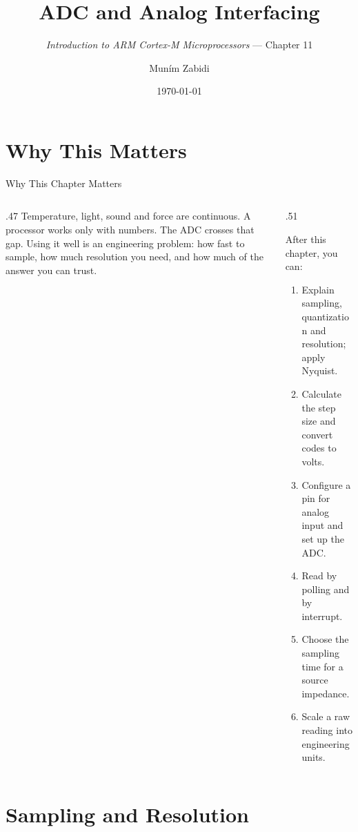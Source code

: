 \documentclass[9pt,aspectratio=169,xcolor=table]{beamer}
\title{ADC and Analog Interfacing}
\subtitle{\emph{Introduction to ARM Cortex-M Microprocessors} --- Chapter 11}
\author{Mun\'{i}m Zabidi}
\institute{\color{primary}Faculty of Electrical Engineering, Universiti Teknologi Malaysia}
\date{\today}
\begin{document}
\titlepage

\section{Why This Matters}

\begin{frame}{Why This Chapter Matters}
    \begin{columns}[T]
    \begin{column}{.47\textwidth}
        {\normalsize Temperature, light, sound and force are continuous. A processor works only with numbers. The ADC crosses that gap. Using it well is an engineering problem: how fast to sample, how much resolution you need, and how much of the answer you can trust.}
    \end{column}
    \begin{column}{.51\textwidth}
        \begin{block}{After this chapter, you can:}
        {\small
        \begin{enumerate}\itemsep2pt
            \item Explain sampling, quantization and resolution; apply Nyquist.
            \item Calculate the step size and convert codes to volts.
            \item Configure a pin for analog input and set up the ADC.
            \item Read by polling and by interrupt.
            \item Choose the sampling time for a source impedance.
            \item Scale a raw reading into engineering units.
        \end{enumerate}}
        \end{block}
    \end{column}
    \end{columns}
\end{frame}


\section{Sampling and Resolution}
\end{document}
